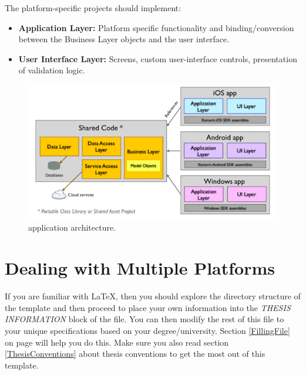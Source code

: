 The platform-specific projects should implement:
\begin{itemize}

\item \textbf{ Application Layer:} Platform specific functionality and binding/conversion between the Business Layer objects and the user interface.
\item \textbf{ User Interface Layer:} Screens, custom user-interface controls, presentation of validation logic.
\end{itemize}

\begin{figure}[th]
\centering
\includegraphics[width=\textwidth] {Figures/Xamarin_architecture}

\caption[architecture]{application architecture.}
\label{fig:architecture}
\end{figure}




\section{Dealing with Multiple Platforms}

If you are familiar with \LaTeX{}, then you should explore the directory structure of the template and then proceed to place your own information into the \emph{THESIS INFORMATION} block of the  file. You can then modify the rest of this file to your unique specifications based on your degree/university. Section \ref{FillingFile} on page \pageref{FillingFile} will help you do this. Make sure you also read section \ref{ThesisConventions} about thesis conventions to get the most out of this template.

